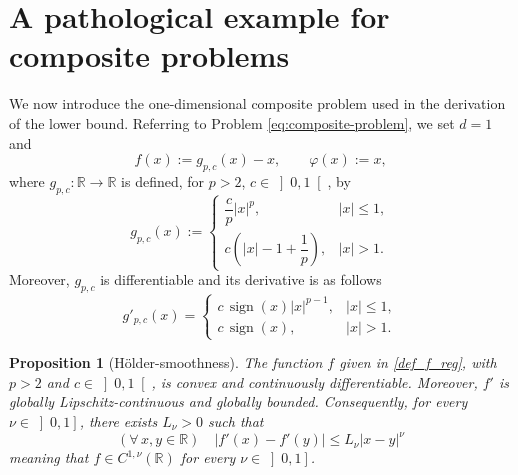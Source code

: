 \documentclass[11pt]{article}
\newtheorem{proposition}{Proposition}
\newcommand{\R}{\mathbb{R}}
\newcommand{\abs}[1]{\lvert{#1}\rvert}
\begin{document}
\section{A pathological example for composite problems}\label{section:2}

We now introduce the one-dimensional composite problem used in the derivation of the lower bound. Referring to Problem \eqref{eq:composite-problem}, we set $d=1$ and 
\begin{equation}
\label{def_f_reg}
    f(x):=g_{p,c}(x)-x, \qquad \varphi(x):=x,
\end{equation}
where \(g_{p,c}\colon\R\to\R\) is defined, for \(p>2\), \(c\in\left]0,1\right[\), by 
\[
g_{p,c}(x)
:=
\begin{cases}
\dfrac{c}{p}|x|^p, & |x|\le 1,\\[0.8em]
c\left(|x|-1+\dfrac1p\right), & |x|>1.
\end{cases}
\]
Moreover, $g_{p,c}$ is differentiable and its derivative is as follows
\begin{equation}
    \label{derivative}
    g'_{p,c}(x)
    =
    \begin{cases}
    c\,\operatorname{sign}(x)|x|^{p-1}, & |x|\le 1,\\[0.4em]
    c\,\operatorname{sign}(x), & |x|>1.
    \end{cases}
\end{equation}

\begin{proposition}[H\"older-smoothness]\label{prop:holder}
    The function \(f\) given in \eqref{def_f_reg}, with $p>2$ and $c\in \left]0,1\right[$, is convex and continuously differentiable. Moreover, \(f'\) is globally Lipschitz-continuous and globally bounded. Consequently, for every \(\nu\in\left]0,1\right]\), there exists \(L_\nu>0\) such that
\begin{equation*}
(\forall\,x,y\in \R)\quad
        \abs{f'(x)-f'(y)}
        \le
        L_\nu |x-y|^\nu
\end{equation*}
    meaning that \(f\in C^{1,\nu}(\R)\) for every \(\nu\in\left]0,1\right]\).
\end{proposition}
\end{document}
